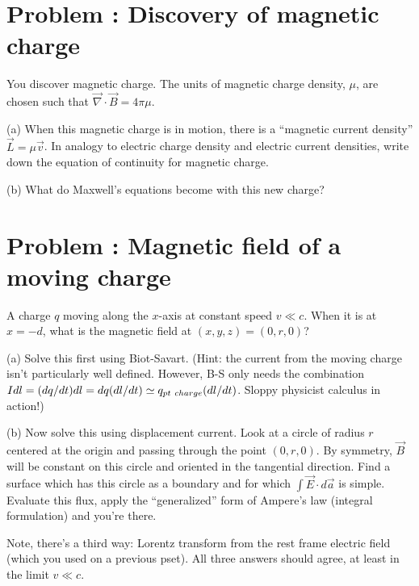 \documentclass[problems]{esg8022pset}
\date{\today }
\begin{document}
\section{Problem \thesection: Discovery of magnetic charge}
You discover magnetic
charge.  The units of magnetic charge density,
$\mu$, are chosen such that $\vec\nabla\cdot\vec B = 4\pi\mu$.

\par\noindent (a) When this magnetic charge is in motion,
there is a ``magnetic current density'' $\vec L = \mu \vec v$.  In
analogy to electric charge density and electric current densities,
write down the equation of continuity for magnetic charge.

\par\noindent (b) What do Maxwell's equations become with this
new charge?
\section{Problem \thesection:  Magnetic field of a moving charge}
A charge $q$ moving
along the $x$-axis at constant speed $v \ll c$.  When it is at $x =
-d$, what is the magnetic field at $(x,y,z) = (0,r,0)$?

\par\noindent (a)  Solve this first using Biot-Savart.  (Hint:
the current from the moving charge isn't particularly well defined.
However, B-S only needs the combination $I dl = (dq/dt) dl = dq
(dl/dt) \simeq q_{\rm pt\ charge}(dl/dt)$.  Sloppy physicist calculus
in action!)

\par\noindent (b)  Now solve this using displacement current.
Look at a circle of radius $r$ centered at the origin and passing
through the point $(0,r,0)$.  By symmetry, $\vec B$ will be constant
on this circle and oriented in the tangential direction.  Find a
surface which has this circle as a boundary and for which $\int \vec
E\cdot d\vec a$ is simple.  Evaluate this flux, apply the
``generalized'' form of Ampere's law (integral formulation) and you're
there.

\par\noindent Note, there's a third way: Lorentz transform from the
rest frame electric field (which you used on a previous pset).  All
three answers should agree, at least in the limit $v \ll c$.
\end{document}
